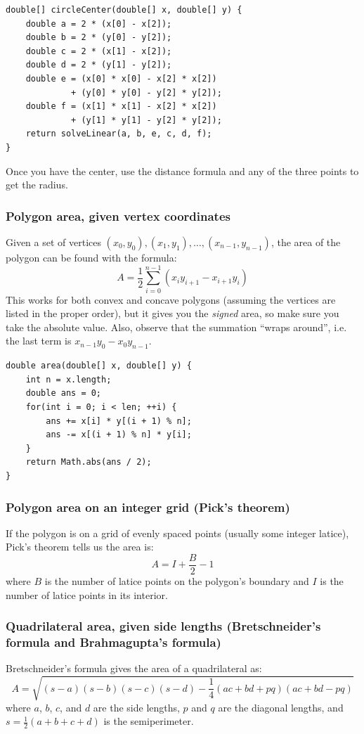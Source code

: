 \documentclass[a4paper,12pt]{article}
\begin{document}
\begin{lstlisting}
double[] circleCenter(double[] x, double[] y) {
	double a = 2 * (x[0] - x[2]);
	double b = 2 * (y[0] - y[2]);
	double c = 2 * (x[1] - x[2]);
	double d = 2 * (y[1] - y[2]);
	double e = (x[0] * x[0] - x[2] * x[2])
	         + (y[0] * y[0] - y[2] * y[2]);
	double f = (x[1] * x[1] - x[2] * x[2])
	         + (y[1] * y[1] - y[2] * y[2]);
	return solveLinear(a, b, e, c, d, f);
}
\end{lstlisting}

Once you have the center, use the distance formula and any of the three points to get the radius.

\subsubsection{Polygon area, given vertex coordinates}
\noindent Given a set of vertices $(x_0, y_0), (x_1, y_1), \dots, (x_{n-1}, y_{n-1})$, the area of the polygon can be found with the formula:
\[A=\frac{1}{2}\sum_{i=0}^{n-1}\left(x_i y_{i+1}-x_{i+1} y_i\right)\]
This works for both convex and concave polygons (assuming the vertices are listed in the proper order), but it gives you the {\em signed} area, so make sure you take the absolute value. Also, observe that the summation ``wraps around'', i.e. the last term is $x_{n-1} y_0-x_0 y_{n-1}$.
\begin{lstlisting}
double area(double[] x, double[] y) {
	int n = x.length;
	double ans = 0;
	for(int i = 0; i < len; ++i) {
		ans += x[i] * y[(i + 1) % n];
		ans -= x[(i + 1) % n] * y[i];
	}
	return Math.abs(ans / 2);
}
\end{lstlisting}

\subsubsection{Polygon area on an integer grid (Pick's theorem)}
\noindent If the polygon is on a grid of evenly spaced points (usually some integer latice), Pick's theorem tells us the area is:
\[A=I+\frac{B}{2}-1\]
where $B$ is the number of latice points on the polygon's boundary and $I$ is the number of latice points in its interior.

\subsubsection{Quadrilateral area, given side lengths (Bretschneider's formula and Brahmagupta's formula)}
Bretschneider's formula gives the area of a quadrilateral as:
\[A=\sqrt{(s-a)(s-b)(s-c)(s-d)-\frac{1}{4}(ac+bd+pq)(ac+bd-pq)}\]
\noindent where $a$, $b$, $c$, and $d$ are the side lengths, $p$ and $q$ are the diagonal lengths, and $s=\frac{1}{2}\left(a+b+c+d\right)$ is the semiperimeter.
\end{document}
